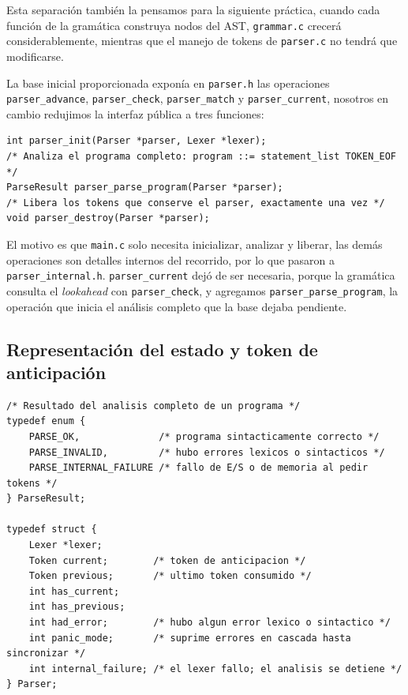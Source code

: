 \documentclass[12pt,letterpaper]{article}
\begin{document}
Esta separación también la pensamos para la siguiente práctica, cuando cada función de la gramática
construya nodos del AST, \texttt{grammar.c} crecerá considerablemente, mientras que el manejo de tokens de
\texttt{parser.c} no tendrá que modificarse.

La base inicial proporcionada exponía en \texttt{parser.h} las operaciones \texttt{parser\_advance},
\texttt{parser\_check}, \texttt{parser\_match} y \texttt{parser\_current}, nosotros en cambio redujimos la
interfaz pública a tres funciones:

\begin{lstlisting}[style=modernc, caption={Interfaz pública de \texttt{parser.h}.}]
int parser_init(Parser *parser, Lexer *lexer);
/* Analiza el programa completo: program ::= statement_list TOKEN_EOF */
ParseResult parser_parse_program(Parser *parser);
/* Libera los tokens que conserve el parser, exactamente una vez */
void parser_destroy(Parser *parser);
\end{lstlisting}

\bigskip

El motivo es que \texttt{main.c} solo necesita inicializar, analizar y liberar, las demás operaciones son
detalles internos del recorrido, por lo que pasaron a \texttt{parser\_internal.h}. \texttt{parser\_current}
dejó de ser necesaria, porque la gramática consulta el \emph{lookahead} con \texttt{parser\_check}, y agregamos
\texttt{parser\_parse\_program}, la operación que inicia el análisis completo que la base dejaba pendiente.

\subsection*{Representación del estado y token de anticipación}

\begin{lstlisting}[style=modernc, caption={Estructuras \texttt{ParseResult} y \texttt{Parser}, definidas en \texttt{parser.h}.}]
/* Resultado del analisis completo de un programa */
typedef enum {
    PARSE_OK,              /* programa sintacticamente correcto */
    PARSE_INVALID,         /* hubo errores lexicos o sintacticos */
    PARSE_INTERNAL_FAILURE /* fallo de E/S o de memoria al pedir tokens */
} ParseResult;

typedef struct {
    Lexer *lexer;
    Token current;        /* token de anticipacion */
    Token previous;       /* ultimo token consumido */
    int has_current;
    int has_previous;
    int had_error;        /* hubo algun error lexico o sintactico */
    int panic_mode;       /* suprime errores en cascada hasta sincronizar */
    int internal_failure; /* el lexer fallo; el analisis se detiene */
} Parser;
\end{lstlisting}
\end{document}
